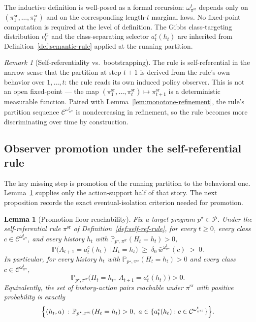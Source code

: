 \documentclass[11pt]{article}
\newtheorem{lemma}[theorem]{Lemma}
\theoremstyle{definition}
\theoremstyle{remark}
\newtheorem{remark}[theorem]{Remark}
\newcommand{\Ccal}{\mathcal{C}}
\newcommand{\Pcal}{\mathcal{P}}
\newcommand{\Prob}{\mathbb{P}}
\begin{document}
The inductive definition is well-posed as a formal recursion: $\omega_{\pi^{\mathrm{sr}}}^t$ depends only on $(\pi^{\mathrm{sr}}_1,\dots,\pi^{\mathrm{sr}}_t)$ and on the corresponding length-$t$ marginal laws. No fixed-point computation is required at the level of definition. The Gibbs class-targeting distribution $\nu_t^{\mathrm G}$ and the class-separating selector $a_t^c(h_t)$ are inherited from Definition~\ref{def:semantic-rule} applied at the running partition.

\begin{remark}[Self-referentiality vs.\ bootstrapping]
\label{rem:self-reference-scope}
The rule is self-referential in the narrow sense that the partition at step $t+1$ is derived from the rule's own behavior over $1,\dots,t$: the rule reads its own induced policy observer. This is not an open fixed-point --- the map $(\pi^{\mathrm{sr}}_1,\dots,\pi^{\mathrm{sr}}_t)\mapsto\pi^{\mathrm{sr}}_{t+1}$ is a deterministic measurable function. Paired with Lemma~\ref{lem:monotone-refinement}, the rule's partition sequence $\Ccal^{\omega_{\pi^{\mathrm{sr}}}^t}$ is nondecreasing in refinement, so the rule becomes more discriminating over time by construction.
\end{remark}

\subsection{Observer promotion under the self-referential rule}
\label{sec:observer-promotion-sr}

The key missing step is promotion of the running partition to the behavioral one. Lemma~\ref{lem:exploration-reachability} supplies only the action-support half of that story. The next proposition records the exact eventual-isolation criterion needed for promotion.

\begin{lemma}[Promotion-floor reachability]
\label{lem:exploration-reachability}
Fix a target program $p^\star\in\Pcal$. Under the self-referential rule $\pi^{\mathrm{sr}}$ of Definition~\ref{def:self-ref-rule}, for every $t\ge 0$, every class $c\in\Ccal^{\omega_{\pi^{\mathrm{sr}}}^t}$, and every history $h_t$ with $\Prob_{p^\star,\pi^{\mathrm{sr}}}(H_t=h_t)>0$,
\[
\Prob\bigl(A_{t+1}=a_t^c(h_t)\,\big|\,H_t=h_t\bigr)\;\ge\;\delta_0\,\bar w^{\omega_{\pi^{\mathrm{sr}}}^t}(c)\;>\;0.
\]
In particular, for every history $h_t$ with $\Prob_{p^\star,\pi^{\mathrm{sr}}}(H_t=h_t)>0$ and every class $c\in\Ccal^{\omega_{\pi^{\mathrm{sr}}}^t}$,
\[
\Prob_{p^\star,\pi^{\mathrm{sr}}}\bigl(H_t=h_t,\ A_{t+1}=a_t^c(h_t)\bigr)>0.
\]
Equivalently, the set of history-action pairs reachable under $\pi^{\mathrm{sr}}$ with positive probability is exactly
\[
\Bigl\{(h_t,a)\,:\,\Prob_{p^\star,\pi^{\mathrm{sr}}}(H_t=h_t)>0,\ 
a\in\{a_t^c(h_t):c\in\Ccal^{\omega_{\pi^{\mathrm{sr}}}^t}\}\Bigr\}.
\]
\end{lemma}
\end{document}
